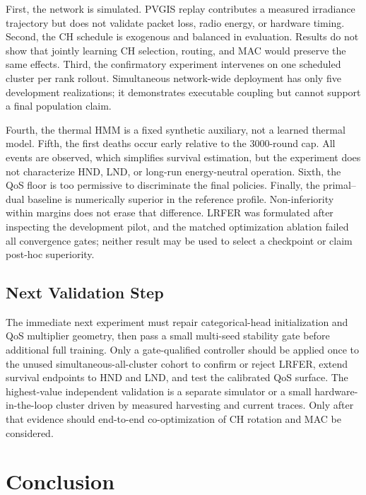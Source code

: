 \documentclass[journal]{IEEEtran}
\begin{document}
First, the network is simulated. PVGIS replay contributes a measured
irradiance trajectory but does not validate packet loss, radio energy, or
hardware timing. Second, the CH schedule is exogenous and balanced in
evaluation. Results do not show that jointly learning CH selection, routing,
and MAC would preserve the same effects. Third, the confirmatory experiment
intervenes on one scheduled cluster per rank rollout. Simultaneous network-wide
deployment has only five development realizations; it demonstrates executable
coupling but cannot support a final population claim.

Fourth, the thermal HMM is a fixed synthetic auxiliary, not a learned thermal
model. Fifth, the first deaths occur early relative to the 3000-round cap. All
events are observed, which simplifies survival estimation, but the experiment
does not characterize HND, LND, or long-run energy-neutral operation. Sixth,
the QoS floor is too permissive to discriminate the final policies. Finally,
the primal--dual baseline is numerically superior in the reference profile.
Non-inferiority within margins does not erase that difference. LRFER was
formulated after inspecting the development pilot, and the matched optimization
ablation failed all convergence gates; neither result may be used to select a
checkpoint or claim post-hoc superiority.

\subsection{Next Validation Step}

The immediate next experiment must repair categorical-head initialization and
QoS multiplier geometry, then pass a small multi-seed stability gate before
additional full training. Only a gate-qualified controller should be applied
once to the unused simultaneous-all-cluster cohort to confirm or reject LRFER,
extend survival endpoints to HND and LND, and test the calibrated QoS surface.
The highest-value independent validation is a separate simulator or a small
hardware-in-the-loop cluster driven by measured harvesting and current traces.
Only after that evidence should end-to-end co-optimization of CH rotation and
MAC be considered.

\section{Conclusion}
\end{document}
